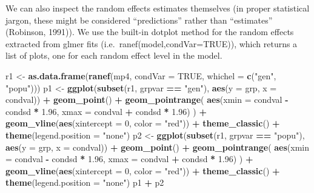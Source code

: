 \documentclass[
  12pt,
]{book}
\newenvironment{Shaded}{\begin{snugshade}}{\end{snugshade}}
\newcommand{\DataTypeTok}[1]{\textcolor[rgb]{0.13,0.29,0.53}{#1}}
\newcommand{\DecValTok}[1]{\textcolor[rgb]{0.00,0.00,0.81}{#1}}
\newcommand{\FloatTok}[1]{\textcolor[rgb]{0.00,0.00,0.81}{#1}}
\newcommand{\KeywordTok}[1]{\textcolor[rgb]{0.13,0.29,0.53}{\textbf{#1}}}
\newcommand{\NormalTok}[1]{#1}
\newcommand{\OperatorTok}[1]{\textcolor[rgb]{0.81,0.36,0.00}{\textbf{#1}}}
\newcommand{\OtherTok}[1]{\textcolor[rgb]{0.56,0.35,0.01}{#1}}
\newcommand{\StringTok}[1]{\textcolor[rgb]{0.31,0.60,0.02}{#1}}
\begin{document}
We can also inspect the random effects estimates themselves (in proper statistical jargon, these might be considered ``predictions'' rather than ``estimates'' (Robinson, 1991)). We use the built-in dotplot method for the random effects extracted from glmer fits (i.e.~ranef(model,condVar=TRUE)), which returns a list of plots, one for each random effect level in the model.

\begin{Shaded}
\begin{Highlighting}[]
\NormalTok{r1 <-}\StringTok{ }\KeywordTok{as.data.frame}\NormalTok{(}\KeywordTok{ranef}\NormalTok{(mp4, }\DataTypeTok{condVar =} \OtherTok{TRUE}\NormalTok{, }\DataTypeTok{whichel =} \KeywordTok{c}\NormalTok{(}\StringTok{"gen"}\NormalTok{, }\StringTok{"popu"}\NormalTok{)))}
\NormalTok{p1 <-}\StringTok{ }\KeywordTok{ggplot}\NormalTok{(}\KeywordTok{subset}\NormalTok{(r1, grpvar }\OperatorTok{==}\StringTok{ "gen"}\NormalTok{), }\KeywordTok{aes}\NormalTok{(}\DataTypeTok{y =}\NormalTok{ grp, }\DataTypeTok{x =}\NormalTok{ condval)) }\OperatorTok{+}
\StringTok{  }\KeywordTok{geom_point}\NormalTok{() }\OperatorTok{+}
\StringTok{  }\KeywordTok{geom_pointrange}\NormalTok{(}
    \KeywordTok{aes}\NormalTok{(}\DataTypeTok{xmin =}\NormalTok{ condval }\OperatorTok{-}\StringTok{ }\NormalTok{condsd }\OperatorTok{*}\StringTok{ }\FloatTok{1.96}\NormalTok{, }\DataTypeTok{xmax =}\NormalTok{ condval }\OperatorTok{+}\StringTok{ }\NormalTok{condsd }\OperatorTok{*}\StringTok{ }\FloatTok{1.96}\NormalTok{)}
\NormalTok{  ) }\OperatorTok{+}
\StringTok{  }\KeywordTok{geom_vline}\NormalTok{(}\KeywordTok{aes}\NormalTok{(}\DataTypeTok{xintercept =} \DecValTok{0}\NormalTok{, }\DataTypeTok{color =} \StringTok{"red"}\NormalTok{)) }\OperatorTok{+}
\StringTok{  }\KeywordTok{theme_classic}\NormalTok{() }\OperatorTok{+}
\StringTok{  }\KeywordTok{theme}\NormalTok{(}\DataTypeTok{legend.position =} \StringTok{"none"}\NormalTok{)}
\NormalTok{p2 <-}\StringTok{ }\KeywordTok{ggplot}\NormalTok{(}\KeywordTok{subset}\NormalTok{(r1, grpvar }\OperatorTok{==}\StringTok{ "popu"}\NormalTok{), }\KeywordTok{aes}\NormalTok{(}\DataTypeTok{y =}\NormalTok{ grp, }\DataTypeTok{x =}\NormalTok{ condval)) }\OperatorTok{+}
\StringTok{  }\KeywordTok{geom_point}\NormalTok{() }\OperatorTok{+}
\StringTok{  }\KeywordTok{geom_pointrange}\NormalTok{(}
    \KeywordTok{aes}\NormalTok{(}\DataTypeTok{xmin =}\NormalTok{ condval }\OperatorTok{-}\StringTok{ }\NormalTok{condsd }\OperatorTok{*}\StringTok{ }\FloatTok{1.96}\NormalTok{, }\DataTypeTok{xmax =}\NormalTok{ condval }\OperatorTok{+}\StringTok{ }\NormalTok{condsd }\OperatorTok{*}\StringTok{ }\FloatTok{1.96}\NormalTok{)}
\NormalTok{  ) }\OperatorTok{+}
\StringTok{  }\KeywordTok{geom_vline}\NormalTok{(}\KeywordTok{aes}\NormalTok{(}\DataTypeTok{xintercept =} \DecValTok{0}\NormalTok{, }\DataTypeTok{color =} \StringTok{"red"}\NormalTok{)) }\OperatorTok{+}
\StringTok{  }\KeywordTok{theme_classic}\NormalTok{() }\OperatorTok{+}
\StringTok{  }\KeywordTok{theme}\NormalTok{(}\DataTypeTok{legend.position =} \StringTok{"none"}\NormalTok{)}
\NormalTok{p1 }\OperatorTok{+}\StringTok{ }\NormalTok{p2}
\end{Highlighting}
\end{Shaded}
\end{document}
